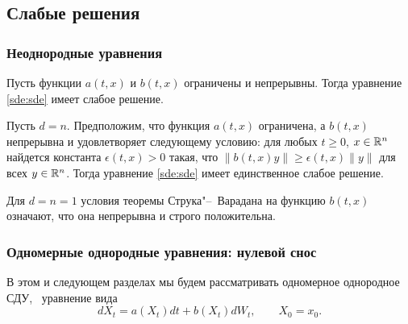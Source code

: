 

\subsection{Слабые решения}
\subsubsection{Неоднородные уравнения}

\begin{theorem}[А.\,B.~Скороход]
Пусть функции $a(t,x)$ и $b(t,x)$ ограничены и непрерывны.
Тогда уравнение \eqref{sde:sde} имеет слабое решение.
\end{theorem}

\begin{theorem}
Пусть $d=n$. Предположим, что функция $a(t,x)$ ограничена, а $b(t,x)$ непрерывна и удовлетворяет следующему условию: для любых $t\ge 0$, $x\in \mathbb{R}^n$ найдется константа $\epsilon(t,x)>0$ такая, что $\|b(t,x)y\| \ge \epsilon(t,x) \|y\|$ для всех $y\in\mathbb{R}^n$.
Тогда уравнение \eqref{sde:sde} имеет единственное слабое решение.
\end{theorem}

\begin{remark}
Для $d=n=1$ условия теоремы Струка"--~Варадана на функцию $b(t,x)$ означают, что она непрерывна и строго положительна.
\end{remark}


\subsubsection{Одномерные однородные уравнения: нулевой снос}

В этом и следующем разделах мы будем рассматривать одномерное однородное СДУ, \te\ уравнение вида
\begin{equation}
\label{sde:homog}
d X_t = a(X_t) dt + b(X_t) d W_t, \qquad X_0=x_0.
\end{equation}

